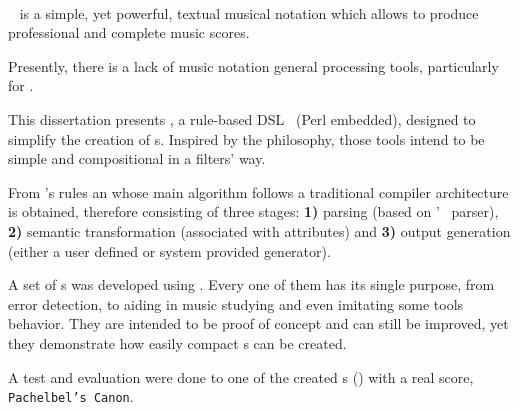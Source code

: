 \paragraph{}

\abc{}~\cite{abcnotation:Online} is a simple, yet powerful, textual musical notation which allows to
produce professional and complete music scores.

Presently, there is a lack of music notation general processing tools, particularly for \abc{}.

This dissertation presents \abcdt{}, a rule-based
\ac{DSL}~\cite{kosar2010comparing,kosar2008preliminary} (Perl embedded), designed to simplify the
creation of \abcpt{}s. Inspired by the \unix{} philosophy, those tools intend to be simple and
compositional in a \unix{} filters' way.

From \abcdt{}'s rules an \abcpt{} whose main algorithm follows a traditional compiler architecture
is obtained, therefore consisting of three stages: \textbf{1)} \abc{} parsing (based on
\abcmtops'~\cite{abcm2ps:Online} parser), \textbf{2)} \abc{} semantic transformation (associated
with \abc{} attributes) and \textbf{3)} output generation (either a user defined or system provided
\abc{} generator).

A set of \abcpt{}s was developed using \abcdt{}. Every one of them has its single purpose, from
error detection, to aiding in music studying and even imitating some \unix{} tools behavior. They
are intended to be proof of concept and can still be improved, yet they demonstrate how easily
compact \abcpt{}s can be created.

A test and evaluation were done to one of the created \abcpt{}s (\canonabc{}) with a real \abc{}
score, \texttt{Pachelbel's Canon}.
